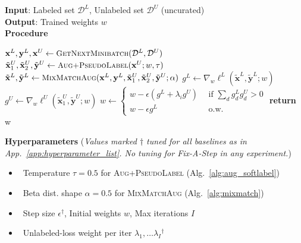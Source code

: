 \begin{algorithm}[!t]
\caption{Fix-A-Step Training}
\label{alg:FixAStep}
\textbf{Input}: Labeled set $\mathcal{D}^L$, Unlabeled set $\mathcal{D}^U$ (uncurated)
\\
\textbf{Output}: Trained weights $w$
\\
\textbf{Procedure} 
\linespread{1.1}\selectfont %
\begin{algorithmic}[1] %
\STATE $\mathbf{x}^L, \mathbf{y}^L, \mathbf{x}^U \gets {\small \textsc{GetNextMinibatch}}(\mathcal{D}^L, \mathcal{D}^U)$
\STATE $\tilde{\mathbf{x}}_1^U,\tilde{\mathbf{x}}_2^U,\tilde{\mathbf{y}}^U \gets {\small \textsc{Aug+PseudoLabel}}(\mathbf{x}^U; w, \tau)$
\STATE $\tilde{\mathbf{x}}^L, \tilde{\mathbf{y}}^L \gets {\small \textsc{MixMatchAug}}(\mathbf{x}^L, \mathbf{y}^L, \tilde{\mathbf{x}}_1^U, \tilde{\mathbf{x}}_2^U, \tilde{\mathbf{y}}^U; \alpha)$ 
\STATE $g^L \gets \nabla_w \ell^L( \tilde{\mathbf{x}}^L, \tilde{\mathbf{y}}^L; w)$
\STATE $g^U \gets \nabla_w \ell^U( \tilde{\mathbf{x}}_1^U, \tilde{\mathbf{y}}^U; w)$
\STATE $w \gets \begin{cases}
w - \epsilon (g^L + \lambda_i g^U) ~~&\text{if~} \sum_d g^L_d g^U_d >0
\\
w - \epsilon g^L ~&\text{o.w.}
\end{cases}
$
\ENDFOR
\STATE \textbf{return} w
\end{algorithmic}
\textbf{Hyperparameters} (\emph{Values marked $\dagger$ tuned for all baselines as in App.~\ref{app:hyperparameter_list}. No tuning for Fix-A-Step in any experiment.})
\begin{itemize}[align=left,style=nextline,leftmargin=*,labelsep=3\parindent,font=\normalfont,topsep=0pt,itemsep=-1ex,partopsep=1ex,parsep=1ex]
	\item ~Temperature $\tau{=}0.5$ for {\small \textsc{Aug+PseudoLabel}} (Alg.~\ref{alg:aug_softlabel})
	\item ~Beta dist. shape $\alpha{=}0.5$ for {\small \textsc{MixMatchAug}} (Alg.~\ref{alg:mixmatch})
	\item ~Step size $\epsilon$$^\dagger$, Initial weights $w$, Max iterations $I$
	\item ~Unlabeled-loss weight per iter $\lambda_1, \ldots \lambda_I$$^\dagger$
\end{itemize}
\end{algorithm}

